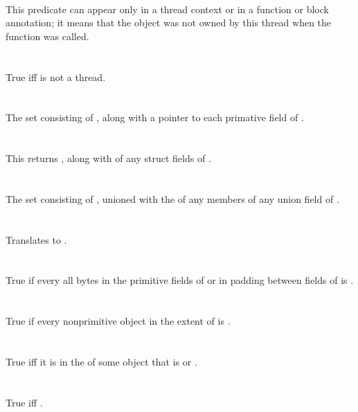 \documentclass[preprint,nocopyrightspace]{sigplanconf}
\begin{document}
{{{{\begin{VCC}
\\
This predicate can appear only in a thread context or in a function or block
 annotation; it means that the object was not owned by this thread
when the function was called.
\\\\
\\
True iff  is not a thread.
\\\\
\\
The set consisting of , along with a pointer to each primative field of .
\\\\
\\
This returns , along with \vcc{\extent} of any struct fields of .
\\\\
\\
The set consisting of , unioned with the  of any members of any union field of .
\\\\
\\
Translates to .
\\\\
\\
True if every all bytes in the primitive fields of  or in padding between fields of  is .
\\\\
\\
True if every nonprimitive object in the extent of  is \vcc{\fresh}.
\\\\
\\
True iff it is in the \vcc{\domain} of some object 
 that is \vcc{\wrapped} or \vcc{\mutable}.
\\\\
\\
True iff .
\\\\
\\

\end{VCC}}}}}
\end{document}
